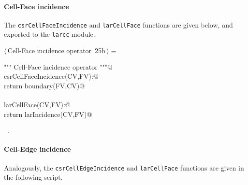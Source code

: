 \documentclass[11pt,oneside]{article}	%
\begin{document}
\paragraph{Cell-Face incidence}
The \texttt{csrCellFaceIncidence} and \texttt{larCellFace} functions are given below, and exported to the \texttt{larcc} module.
\begin{flushleft} \small \label{scrap40}
\protect{}$\langle\,$Cell-Face incidence operator\nobreak\ {\footnotesize 25b}$\,\rangle\equiv$
\vspace{-1ex}
\begin{list}{}{} \item
\mbox{}\verb@""" Cell-Face incidence operator """@\\
\mbox{}\verb@def csrCellFaceIncidence(CV,FV):@\\
\mbox{}\verb@   return boundary(FV,CV)@\\
\mbox{}\verb@@\\
\mbox{}\verb@def larCellFace(CV,FV):@\\
\mbox{}\verb@   return larIncidence(CV,FV)@\\
\mbox{}\verb@@{\NWsep}
\end{list}
\vspace{-1ex}
\footnotesize\addtolength{\baselineskip}{-1ex}
\begin{list}{}{\setlength{\itemsep}{-\parsep}\setlength{\itemindent}{-\leftmargin}}
\item \NWtxtMacroRefIn\ .
\end{list}
\end{flushleft}

\paragraph{Cell-Edge incidence}
Analogously, the \texttt{csrCellEdgeIncidence} and \texttt{larCellFace} functions are given in the following script.
\end{document}
